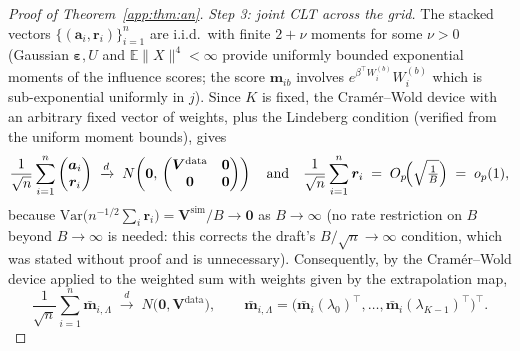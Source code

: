 \documentclass[11pt]{article}
\theoremstyle{plain}
\theoremstyle{definition}
\newcommand{\E}{\mathbb{E}}
\newcommand{\Var}{\mathrm{Var}}
\newcommand{\beps}{\bm{\varepsilon}}
\newcommand{\btV}{\bm{V}}
\begin{document}
\begin{proof}[Proof of Theorem~\ref{app:thm:an}]
\emph{Step 3: joint CLT across the grid.} The stacked vectors
$\{(\bm a_i,\bm r_i)\}_{i=1}^n$ are i.i.d.\ with finite $2+\nu$ moments
for some $\nu>0$ (Gaussian $\beps,U$ and $\E\|X\|^4<\infty$ provide
uniformly bounded exponential moments of the influence scores; the score
$\bm m_{ib}$ involves $e^{\beta^\top W_i^{(b)}}W_i^{(b)}$ which is
sub-exponential uniformly in $j$). Since $K$ is fixed, the Cram\'er--Wold
device with an arbitrary fixed vector of weights, plus the Lindeberg
condition (verified from the uniform moment bounds), gives
\[
  \frac{1}{\sqrt n}\sum_{i=1}^n
  \begin{pmatrix}\bm a_i\\ \bm r_i\end{pmatrix}
  \;\xrightarrow{d}\;
  N\!\left(\bm 0,\,
  \begin{pmatrix}\btV^{\mathrm{data}} & \bm 0\\ \bm 0 & \bm 0\end{pmatrix}
  \right)
  \quad\text{and}\quad
  \frac{1}{\sqrt n}\sum_{i=1}^n\bm r_i
  \;=\;O_p\!\Bigl(\sqrt{\tfrac1B}\Bigr)\;=\;o_p(1),
\]
because $\Var\bigl(n^{-1/2}\sum_i\bm r_i\bigr)=\btV^{\mathrm{sim}}/B\to
\bm 0$ as $B\to\infty$ (no rate restriction on $B$ beyond
$B\to\infty$ is needed: this corrects the draft's $B/\sqrt n\to\infty$
condition, which was stated without proof and is unnecessary).
Consequently, by the Cram\'er--Wold device applied to the weighted sum
with weights given by the extrapolation map,
\[
  \frac{1}{\sqrt n}\sum_{i=1}^n\bar{\bm m}_{i,\Lambda}
  \;\xrightarrow{d}\;N\bigl(\bm 0,\btV^{\mathrm{data}}\bigr),
  \qquad
  \bar{\bm m}_{i,\Lambda}=\bigl(\bar{\bm m}_i(\lambda_0)^\top,\dots,
  \bar{\bm m}_i(\lambda_{K-1})^\top\bigr)^\top .
\]


\end{proof}
\end{document}
